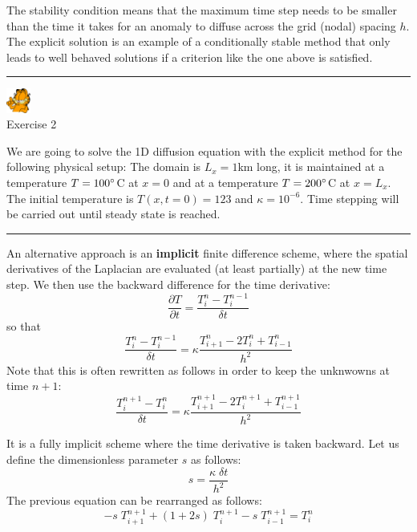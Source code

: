 The stability condition means that the maximum time step needs to be smaller than the time it
takes for an anomaly to diffuse across the grid (nodal) spacing $h$.
The explicit solution is an example of a {\color{olive} conditionally stable method}
that only leads to well behaved solutions if a criterion like the one above is satisfied.

\begin{center}
\begin{minipage}[t]{0.77\textwidth}
\par\noindent\rule{\textwidth}{0.4pt}

\begin{center}
\includegraphics[width=0.8cm]{images/garftr} \\
{\color{orange}Exercise 2}
\end{center}

We are going to solve the 1D diffusion equation with the explicit method
for the following physical setup: The domain is $L_x=1$km long, 
it is maintained at a temperature $T=100\degree$C at $x=0$ and at a temperature
$T=200\degree$C at $x=L_x$. The initial temperature is $T(x,t=0)=123$
and $\kappa=10^{-6}$. 
Time stepping will be carried out until steady state is reached.

\par\noindent\rule{\textwidth}{0.4pt}
\end{minipage}
\end{center}

\noindent An alternative approach is an {\bf implicit} finite difference scheme, where the spatial derivatives
of the Laplacian are evaluated (at least partially) at the new time step.
We then use the backward difference for the time derivative:
\[
\frac{\partial T}{\partial t} 
= \frac{T_{i}^{n}-T_i^{n-1}}{\delta t} 
\]
so that
\[
\frac{T_{i}^{n}-T_i^{n-1}}{\delta t} 
= \kappa \frac{T_{i+1}^n - 2T_i^n + T_{i-1}^n}{h^2}
\]
Note that this is often rewritten as follows in order to keep the unknwowns at time $n+1$:
\[
\frac{T_{i}^{n+1}-T_i^{n}}{\delta t} 
= \kappa \frac{T_{i+1}^{n+1} - 2T_i^{n+1} + T_{i-1}^{n+1}}{h^2}
\]

It is a fully implicit scheme where the time derivative is taken backward.
Let us define the dimensionless parameter $s$ as follows:
\[
s=\frac{\kappa \; \delta t}{h^2}
\]
The previous equation can be rearranged as follows:
\[
\boxed{
-s \; T_{i+1}^{n+1} + (1+2s)\; T_{i}^{n+1} - s\; T_{i-1}^{n+1} = T_i^{n}
}
\]

